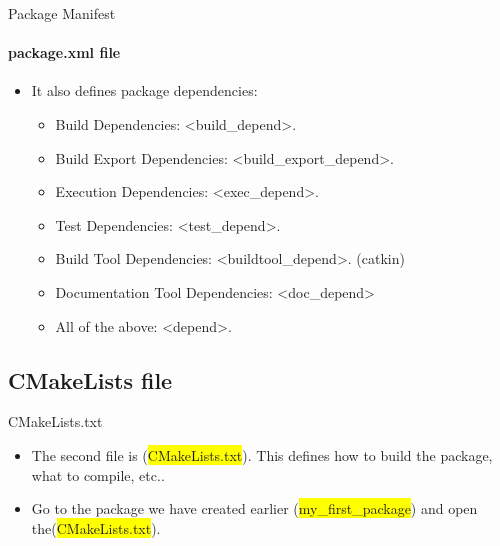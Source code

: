 \documentclass{beamer}
\begin{document}
   \begin{frame}{Package Manifest}
       \framesubtitle{package.xml file}    
    \begin{itemize}
        \item It also defines package dependencies:
        \begin{itemize}
            \item  Build Dependencies: {\color{red}<build\_depend>}.
            \item Build Export Dependencies: {\color{red}<build\_export\_depend>}.
            \item Execution Dependencies: {\color{red}<exec\_depend>}.
            \item Test Dependencies: {\color{red}<test\_depend>}.
            \item Build Tool Dependencies: {\color{red}<buildtool\_depend>}. (catkin)
            \item Documentation Tool Dependencies: {\color{red}<doc\_depend>}
            \item All of the above: {\color{red}<depend>}.
        \end{itemize}
    \end{itemize}
    
\end{frame}




\subsection{CMakeLists file}

\begin{frame}{CMakeLists.txt}
    
    \begin{itemize}
        \item The second file is ({\ttfamily \colorbox{yellow}{CMakeLists.txt}}). This defines how to build the package, what to compile, etc..
        \item Go to the package we have created earlier ({\ttfamily \colorbox{yellow}{my\_first\_package}}) and open the({\ttfamily \colorbox{yellow}{CMakeLists.txt}}).
    \end{itemize}
\end{frame}
\end{document}
